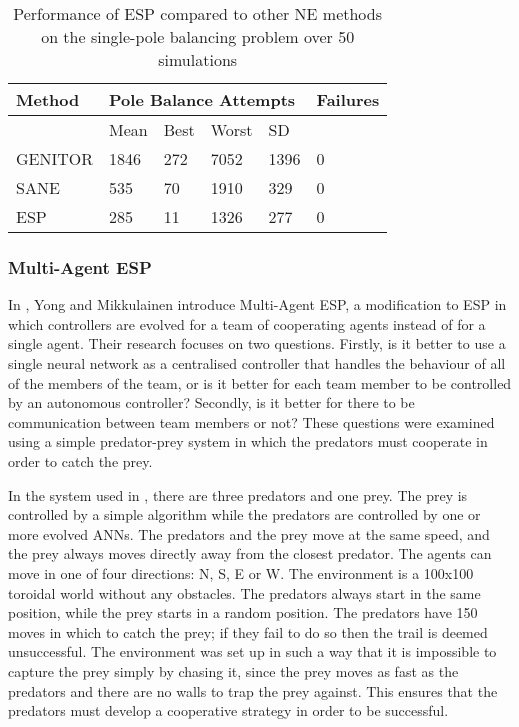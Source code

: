 \documentclass[12pt]{article} %
\begin{document}
\begin{table}
    \begin{tabular}{|l|l|l|l|l|l|}
    \hline
    Method  & \multicolumn{4}{l|}{Pole Balance Attempts} & Failures \\ \hline
    ~       & Mean                  & Best & Worst & SD   & ~        \\ \hline
    GENITOR & 1846                  & 272  & 7052  & 1396 & 0        \\ \hline
    SANE    & 535                   & 70   & 1910  & 329  & 0        \\ \hline
    ESP     & 285                   & 11   & 1326  & 277  & 0        \\ \hline
    \end{tabular}
    \caption {Performance of ESP compared to other NE methods on the single-pole balancing problem over 50 simulations}
\end{table}

\subsubsection{Multi-Agent ESP}

In \cite{Yong2001}, Yong and Mikkulainen introduce Multi-Agent ESP, a modification to ESP in which controllers are evolved for a team of cooperating agents instead of for a single agent. Their research focuses on two questions. Firstly, is it better to use a single neural network as a centralised controller that handles the behaviour of all of the members of the team, or is it better for each team member to be controlled by an autonomous controller? Secondly, is it better for there to be communication between team members or not? These questions were examined using a simple predator-prey system in which the predators must cooperate in order to catch the prey.

In the system used in \cite{Yong2001}, there are three predators and one prey. The prey is controlled by a simple algorithm while the predators are controlled by one or more evolved ANNs. The predators and the prey move at the same speed, and the prey always moves directly away from the closest predator. The agents can move in one of four directions: N, S, E or W. The environment is a 100x100 toroidal world without any obstacles. The predators always start in the same position, while the prey starts in a random position. The predators have 150 moves in which to catch the prey; if they fail to do so then the trail is deemed unsuccessful. The environment was set up in such a way that it is impossible to capture the prey simply by chasing it, since the prey moves as fast as the predators and there are no walls to trap the prey against. This ensures that the predators must develop a cooperative strategy in order to be successful.
\end{document}
